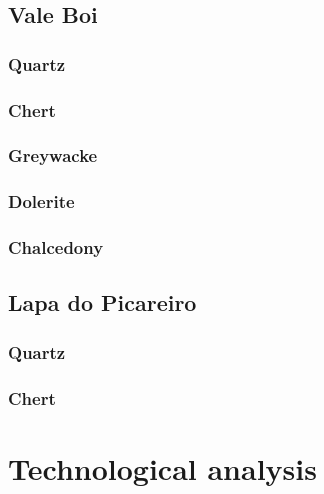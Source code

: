 \documentclass[12pt,twoside]{reedthesis}
\begin{document}
\hypertarget{vale-boi-3}{%
\subsection{Vale Boi}\label{vale-boi-3}}

\hypertarget{quartz}{%
\subsubsection{Quartz}\label{quartz}}

\hypertarget{chert}{%
\subsubsection{Chert}\label{chert}}

\hypertarget{greywacke}{%
\subsubsection{Greywacke}\label{greywacke}}

\hypertarget{dolerite}{%
\subsubsection{Dolerite}\label{dolerite}}

\hypertarget{chalcedony}{%
\subsubsection{Chalcedony}\label{chalcedony}}

\hypertarget{lapa-do-picareiro-3}{%
\subsection{Lapa do Picareiro}\label{lapa-do-picareiro-3}}

\hypertarget{quartz-1}{%
\subsubsection{Quartz}\label{quartz-1}}

\hypertarget{chert-1}{%
\subsubsection{Chert}\label{chert-1}}

\hypertarget{technological-analysis}{%
\section{Technological analysis}\label{technological-analysis}}
\end{document}
